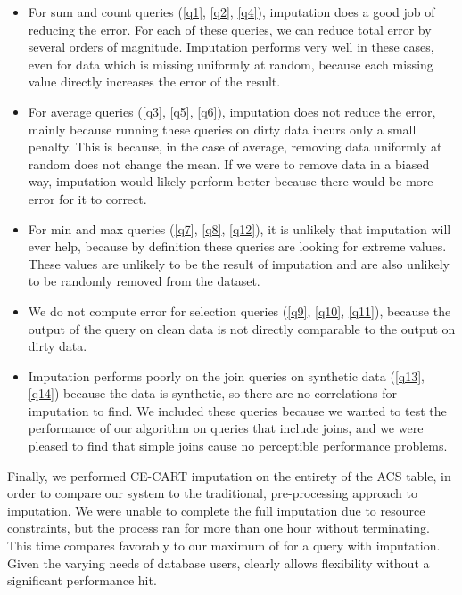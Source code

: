 \begin{itemize}
\item For sum and count queries (\ref{q1}, \ref{q2}, \ref{q4}), imputation does a good job of reducing the error.
For each of these queries, we can reduce total error by several orders of magnitude.
Imputation performs very well in these cases, even for data which is missing uniformly at random, because each missing value directly increases the error of the result.

\item For average queries (\ref{q3}, \ref{q5}, \ref{q6}), imputation does not reduce the error, mainly because running these queries on dirty data incurs only a small penalty.
This is because, in the case of average, removing data uniformly at random does not change the mean.
If we were to remove data in a biased way, imputation would likely perform better because there would be more error for it to correct.

\item For min and max queries (\ref{q7}, \ref{q8}, \ref{q12}), it is unlikely that imputation will ever help, because by definition these queries are looking for extreme values.
These values are unlikely to be the result of imputation and are also unlikely to be randomly removed from the dataset.

\item We do not compute error for selection queries (\ref{q9}, \ref{q10}, \ref{q11}), because the output of the query on clean data is not directly comparable to the output on dirty data.

  \item Imputation performs poorly on the join queries on synthetic data (\ref{q13}, \ref{q14}) because the data is synthetic, so there are no correlations for imputation to find. We included these queries because we wanted to test the performance of our algorithm on queries that include joins, and we were pleased to find that simple joins cause no perceptible performance problems.
\end{itemize}

Finally, we performed CE-CART imputation on the entirety of the ACS table, in order to compare our system to the traditional, pre-processing approach to imputation.
We were unable to complete the full imputation due to resource constraints, but the process ran for more than one hour without terminating.
This time compares favorably to our maximum of  for a query with imputation.
Given the varying needs of database users, \ProjectName{} clearly allows flexibility without a significant performance hit.


